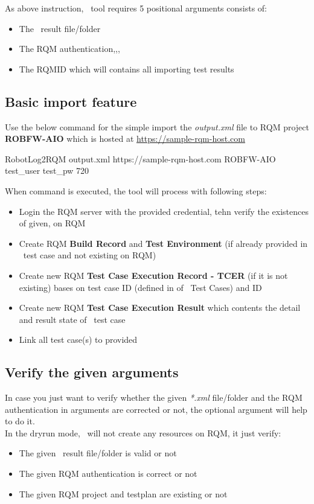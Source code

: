 As above instruction, \pkg\ tool requires 5 positional arguments consists of:
\begin{itemize}
  \item The \rfwcore\ result file/folder
  \item The RQM authentication,,,
  \item The RQMID which will contains all importing test results
\end{itemize}

\subsection{Basic import feature}
Use the below command for the simple import the \emph{output.xml} file to RQM
project \textbf{ROBFW-AIO} which is hosted at
\href{https://sample-rqm-host.com}{https://sample-rqm-host.com}
\begin{robotlog}
RobotLog2RQM output.xml https://sample-rqm-host.com ROBFW-AIO test_user test_pw 720
\end{robotlog}

When command is executed, the tool will process with following steps:
\begin{itemize}
\item Login the RQM server with the provided credential, tehn verify the
      existences of given, on RQM
\item Create RQM \textbf{Build Record} and \textbf{Test Environment} (if already
      provided in \rfwcore\ test case and not existing on RQM)
\item Create new RQM \textbf{Test Case Execution Record - TCER}
      (if it is not existing) bases on test case ID (defined  in
      \rcode{[Tags]} of \rfwcore\ Test Cases) and  ID
\item Create new RQM \textbf{Test Case Execution Result} which contents
      the detail and result state of \rfwcore\ test case
\item Link all test case(s) to provided 
\end{itemize}

\subsection{Verify the given arguments}
In case you just want to verify whether the given \emph{*.xml} file/folder and
the RQM authentication in arguments are corrected or not, the optional argument
 will help to do it.
\\
In the dryrun mode, \pkg\ will not create any resources on RQM, it
just verify:
\begin{itemize}
  \item The given \rfwcore\ result file/folder is valid or not
  \item The given RQM authentication is correct or not
  \item The given RQM project and testplan are existing or not
\end{itemize}

